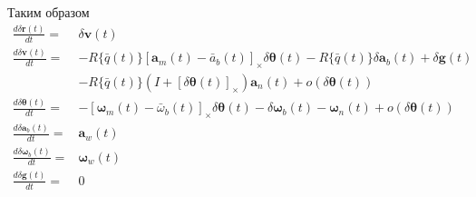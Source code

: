 \documentclass[12pt]{article}
\begin{document}
Таким образом
\begin{equation}
    \begin{aligned}
        \frac{d \delta\pmb{r}(t)}{d t}=        & \delta\pmb{v}(t)                                                           \\
        \frac{d \delta\pmb{v}(t)}{d t}
        =                                      & -R\{\bar{q}(t)\} [\pmb{a}_m(t) - \bar{a}_b(t)]_\times\delta\pmb{\theta}(t)
        - R\{\bar{q}(t)\} \delta\pmb{a}_b(t)
        + \delta\pmb{g}(t)                                                                                                  \\
                                               & - R\{\bar{q}(t)\}(I+[\delta\pmb{\theta}(t)]_\times) \pmb{a}_n(t)
        + o(\delta\pmb{\theta}(t))                                                                                          \\
        \frac{d \delta\pmb{\theta}(t)}{d t}=   & -[\pmb{\omega}_m(t) - \bar{\omega}_b(t)]_\times \delta \pmb{\theta}(t)
        - \delta \pmb{\omega}_b(t)
        - \pmb{\omega}_n(t) + o(\delta\pmb{\theta}(t))                                                                      \\
        \frac{d \delta\pmb{a}_b(t)}{d t}=      & \pmb{a}_w(t)                                                               \\
        \frac{d \delta\pmb{\omega}_b(t)}{d t}= & \pmb{\omega}_w(t)                                                          \\
        \frac{d \delta\pmb{g}(t)}{d t}=        & 0                                                                          \\
    \end{aligned}
\end{equation}
\end{document}
